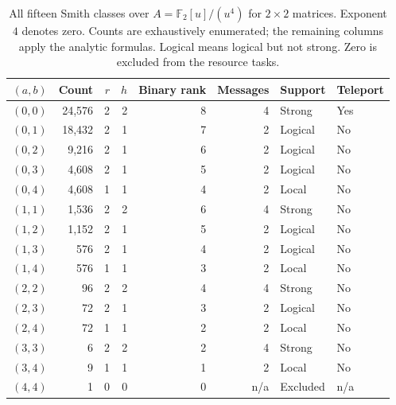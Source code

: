 \begin{table}[ht]\centering\small
\begin{tabular}{rrrrrrll}
\toprule
$(a,b)$ & Count & $r$ & $h$ & Binary rank & Messages & Support & Teleport\\\midrule
$(0,0)$ & 24,576 & 2 & 2 & 8 & 4 & Strong & Yes\\
$(0,1)$ & 18,432 & 2 & 1 & 7 & 2 & Logical & No\\
$(0,2)$ & 9,216 & 2 & 1 & 6 & 2 & Logical & No\\
$(0,3)$ & 4,608 & 2 & 1 & 5 & 2 & Logical & No\\
$(0,4)$ & 4,608 & 1 & 1 & 4 & 2 & Local & No\\
$(1,1)$ & 1,536 & 2 & 2 & 6 & 4 & Strong & No\\
$(1,2)$ & 1,152 & 2 & 1 & 5 & 2 & Logical & No\\
$(1,3)$ & 576 & 2 & 1 & 4 & 2 & Logical & No\\
$(1,4)$ & 576 & 1 & 1 & 3 & 2 & Local & No\\
$(2,2)$ & 96 & 2 & 2 & 4 & 4 & Strong & No\\
$(2,3)$ & 72 & 2 & 1 & 3 & 2 & Logical & No\\
$(2,4)$ & 72 & 1 & 1 & 2 & 2 & Local & No\\
$(3,3)$ & 6 & 2 & 2 & 2 & 4 & Strong & No\\
$(3,4)$ & 9 & 1 & 1 & 1 & 2 & Local & No\\
$(4,4)$ & 1 & 0 & 0 & 0 & n/a & Excluded & n/a\\
\bottomrule\end{tabular}
\caption{All fifteen Smith classes over $A=\mathbb F_2[u]/(u^4)$ for $2\times2$ matrices. Exponent $4$ denotes zero. Counts are exhaustively enumerated; the remaining columns apply the analytic formulas. Logical means logical but not strong. Zero is excluded from the resource tasks.}\label{tab:smith}
\end{table}
